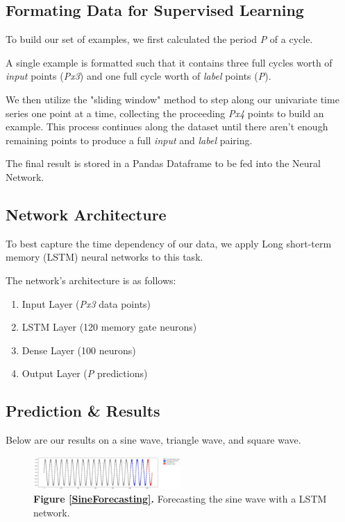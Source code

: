 \documentclass[letterpaper, 10 pt, conference]{ieeeconf}  %
\begin{document}
\subsection{Formating Data for Supervised Learning}


To build our set of examples, we first calculated the period \textit{P} of a cycle.

A single example is formatted such that it contains three full cycles worth of \textit{input} points (\textit{Px3}) and one full cycle worth of \textit{label} points (\textit{P}).

We then utilize the "sliding window" method to step along our univariate time series one point at a time, collecting the proceeding \textit{Px4} points to build an example. This process continues along the dataset until there aren't enough remaining points to produce a full \textit{input} and \textit{label} pairing.

The final result is stored in a Pandas Dataframe to be fed into the Neural Network.

\subsection{Network Architecture}
To best capture the time dependency of our data, we apply Long short-term memory (LSTM) neural networks to this task.

The network's architecture is as follows:
\begin{enumerate}
\item Input Layer (\textit{Px3} data points)
\item LSTM Layer  (120 memory gate neurons)
\item Dense Layer (100 neurons)
\item Output Layer (\textit{P} predictions)
\end{enumerate}

\subsection{Prediction \& Results}
Below are our results on a sine wave, triangle wave, and square wave.

\label{SineForecasting}
\begin{figure}[h]
	\centering
	\includegraphics[width=0.5\textwidth]{assets/sine_forecast.png}
    \caption{\textbf{Figure \ref{SineForecasting}.} Forecasting the sine wave with a LSTM network.}
\end{figure}
\end{document}
